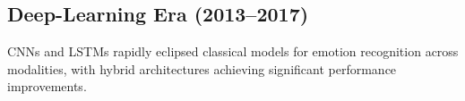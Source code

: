 \subsection{Deep-Learning Era (2013–2017)}
CNNs and LSTMs rapidly eclipsed classical models for emotion recognition across modalities, with hybrid architectures achieving significant performance improvements.
